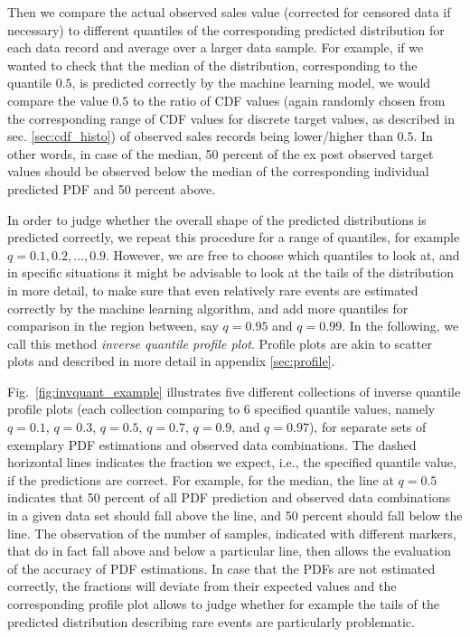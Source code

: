\documentclass[BCOR=1mm, DIV=calc,10pt,
twoside=true,
twocolumn,
headings=normal]{scrartcl}
\newcommand{\fig}{Fig.~}
\begin{document}
Then we compare the actual observed sales value (corrected for censored data if necessary) to different quantiles of the corresponding predicted distribution for each data record and average over a larger data sample. For example, if we wanted to check that the median of the distribution, corresponding to the quantile $0.5$, is predicted correctly by the machine learning model, we would compare the value $0.5$ to the ratio of CDF values (again randomly chosen from the corresponding range of CDF values for discrete target values, as described in sec. \ref{sec:cdf_histo}) of observed sales records being lower/higher than $0.5$. In other words, in case of the median, 50 percent of the ex post observed target values should be observed below the median of the corresponding individual predicted PDF and 50 percent above.

In order to judge whether the overall shape of the predicted distributions is predicted correctly, we repeat this procedure for a range of quantiles, for example $q = 0.1, 0.2, \ldots, 0.9$. However, we are free to choose which quantiles to look at, and in specific situations it might be advisable to look at the tails of the distribution in more detail, to make sure that even relatively rare events are estimated correctly by the machine learning algorithm, and add more quantiles for comparison in the region between, say $q = 0.95$ and $q = 0.99$. In the following, we call this method {\em inverse quantile profile plot}. Profile plots are akin to scatter plots and described in more detail in appendix \ref{sec:profile}.

\fig \ref{fig:invquant_example} illustrates five different collections of inverse quantile profile plots (each collection comparing to 6 specified quantile values, namely $q = 0.1$, $q = 0.3$, $q = 0.5$, $q = 0.7$, $q = 0.9$, and $q = 0.97$), for separate sets of exemplary PDF estimations and observed data combinations. The dashed horizontal lines indicates the fraction we expect, i.e., the specified quantile value, if the predictions are correct. For example, for the median, the line at $q = 0.5$ indicates that  50 percent of all PDF prediction and observed data combinations in a given data set should fall above the line, and 50 percent should fall below the line. The observation of the number of samples, indicated with different markers, that do in fact fall above and below a particular line, then allows the evaluation of the accuracy of PDF estimations. In case that the PDFs are not estimated correctly, the fractions will deviate from their expected values and the corresponding profile plot allows to judge whether for example the tails of the predicted distribution describing rare events are particularly problematic.
\end{document}
